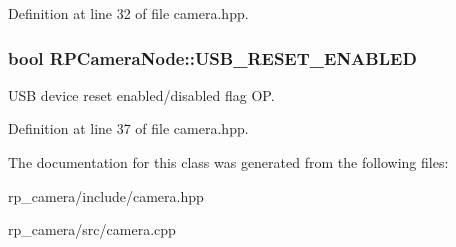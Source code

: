 \-Definition at line 32 of file camera.\-hpp.

\hypertarget{class_r_p_camera_node_a48ca485f3692b562413f1be1c6fa4952}{
\subsubsection[{\-U\-S\-B\-\_\-\-R\-E\-S\-E\-T\-\_\-\-E\-N\-A\-B\-L\-E\-D}]{\setlength{\rightskip}{0pt plus 5cm}bool {\bf \-R\-P\-Camera\-Node\-::\-U\-S\-B\-\_\-\-R\-E\-S\-E\-T\-\_\-\-E\-N\-A\-B\-L\-E\-D}}}\label{class_r_p_camera_node_a48ca485f3692b562413f1be1c6fa4952}
\-U\-S\-B device reset enabled/disabled flag \-O\-P. 

\-Definition at line 37 of file camera.\-hpp.



\-The documentation for this class was generated from the following files\-:\begin{DoxyCompactItemize}
\item 
rp\-\_\-camera/include/camera.\-hpp\item 
rp\-\_\-camera/src/camera.\-cpp\end{DoxyCompactItemize}
